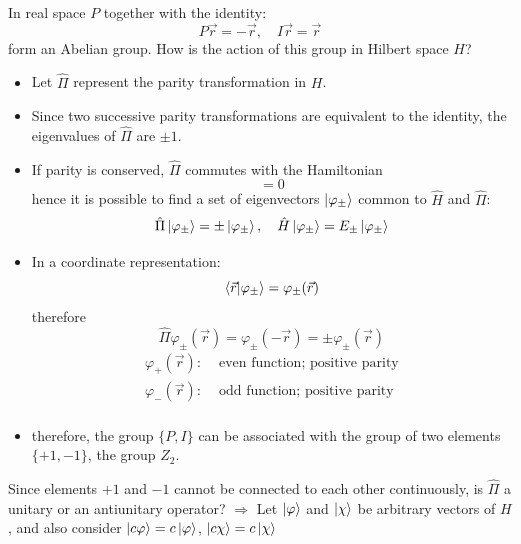 \documentclass[12pt]{article}
\newcommand{\be}{\begin{equation}}
\newcommand{\ee}{\end{equation}}
\begin{document}
In real space $P$ together with the identity:
\be
P\vec{r} = - \vec{r},\quad I\vec{r} = \vec{r}
\ee
form an Abelian group. How is the action of this
group in Hilbert space $H$?
\begin{itemize}
\item Let $\hat{\Pi}$ represent the parity transformation in $H$.
%
\item Since two successive parity transformations
are equivalent to the identity, the eigenvalues
of $\hat{\Pi}$ are $\pm1$.
%
\item If parity is conserved, $\hat{\Pi}$ commutes with
the Hamiltonian
\be
[\hat{\Pi},\hat{H}] = 0
\ee
hence it is possible to find a set of eigenvectors
$\ket{\varphi_\pm}$ common to $\hat{H}$ and $\hat{\Pi}$:
\be
\hat{\Pi}\ket{\varphi_\pm} = \pm\ket{\varphi_\pm},\quad
\hat{H}\ket{\varphi_\pm} = E_\pm \ket{\varphi_\pm}
\ee
%
\item In a coordinate representation:
\be
\bra{\vec{r}}\ket{\varphi_\pm} = \varphi_\pm(\vec{r})
\ee
therefore
\be
\hat{\Pi} \varphi_\pm(\vec{r}) =  \varphi_\pm(-\vec{r}) = \pm \varphi_\pm(\vec{r})
\ee
\[
\begin{aligned}
\varphi_+(\vec{r}):& \text{ even function; positive parity}\\
\varphi_-(\vec{r}):& \text{ odd function; positive parity}\\
\end{aligned}
\]
\item therefore, the group $\{P,I\}$ can be associated
with the group of two elements $\{+1,-1\}$, the
group $Z_2$.
\end{itemize}

Since elements $+1$ and $-1$ cannot be connected
to each other continuously, is $\hat{\Pi}$ a unitary or
an antiunitary operator? $\Rightarrow$
Let $\ket{\varphi}$ and $\ket{\chi}$ be arbitrary vectors of $H$,
and also consider $\ket{c\varphi} = c\ket{\varphi}$, $\ket{c\chi} = c\ket{\chi}$

\end{document}
